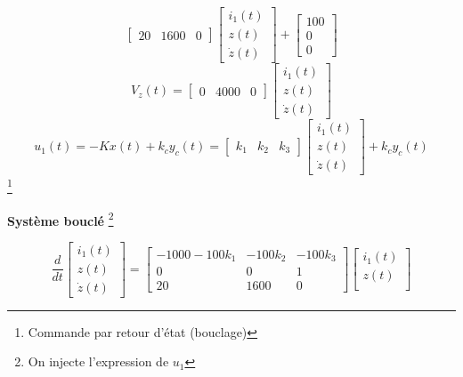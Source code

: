 {{{{\begin{center}
\[\begin{bmatrix}
        20    & 1600 & 0
    \end{bmatrix}
    \begin{bmatrix}
        i_{1}(t) \\
        z(t) \\
        \dot{z}(t)    
    \end{bmatrix}
    +
    \begin{bmatrix}
        100 \\
        0 \\
        0
    \end{bmatrix}
    \] \newline
    \[
    V_{z}(t) = 
    \begin{bmatrix}
        0 & 4000 & 0
    \end{bmatrix}
    \begin{bmatrix}
        i_{1}(t) \\
        z(t) \\
        \dot{z}(t)    
    \end{bmatrix}
    \] \newline
    \[
    u_{1}(t) = -Kx(t) + k_{c}y_{c}(t) =
    \begin{bmatrix}
        k_{1} & k_{2} & k_{3}
    \end{bmatrix}
    \begin{bmatrix}
        i_{1}(t) \\
        z(t) \\
        \dot{z}(t)    
    \end{bmatrix}
    + k_{c}y_{c}(t)
    \] \footnote{Commande par retour d'état (bouclage)}
\end{center}
\newpage
\textbf{Système bouclé} \footnote{On injecte l'expression de $u_{1}$}
\begin{center}
    \[
    \frac{d}{dt}
    \begin{bmatrix}
    i_{1}(t) \\
    z(t) \\
    \dot{z}(t)    
    \end{bmatrix}
    =
    \begin{bmatrix}
        -1000-100k_{1} & -100k_{2}  & -100k_{3} \\
        0              & 0          & 1         \\
        20             & 1600       & 0
    \end{bmatrix}
    \begin{bmatrix}
        i_{1}(t) \\
        z(t) \\

\end{bmatrix}\]
\end{center}}}}}

